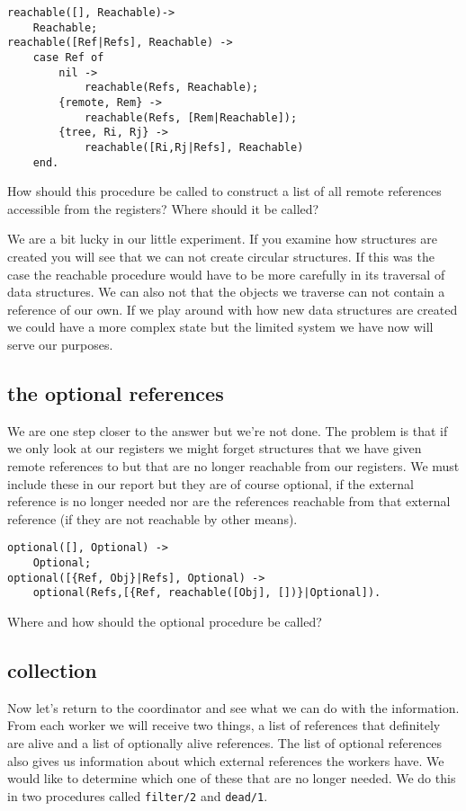 \documentclass[a4paper,11pt]{article}
\begin{document}
\begin{verbatim}
reachable([], Reachable)->
    Reachable;
reachable([Ref|Refs], Reachable) ->
    case Ref of
        nil ->
            reachable(Refs, Reachable);
        {remote, Rem} ->
            reachable(Refs, [Rem|Reachable]);
        {tree, Ri, Rj} ->
            reachable([Ri,Rj|Refs], Reachable)
    end.
\end{verbatim}

How should this procedure be called to construct a list of all remote
references accessible from the registers? Where should it be called?

We are a bit lucky in our little experiment. If you examine how
structures are created you will see that we can not create circular
structures. If this was the case the reachable procedure would have to
be more carefully in its traversal of data structures. We can also not
that the objects we traverse can not contain a reference of our
own. If we play around with how new data structures are created we
could have a more complex state but the limited system we have now
will serve our purposes.

\subsection{the optional references}

We are one step closer to the answer but we're not done. The
problem is that if we only look at our registers we might forget
structures that we have given remote references to but that are no longer
reachable from our registers. We must include these in our report but
they are of course optional, if the external reference is no longer
needed nor are the references reachable from that external reference
(if they are not reachable by other means). 

\begin{verbatim}
optional([], Optional) ->
    Optional;
optional([{Ref, Obj}|Refs], Optional) ->
    optional(Refs,[{Ref, reachable([Obj], [])}|Optional]).
\end{verbatim}

Where and how should the optional procedure be called?

\subsection{collection}

Now let's return to the coordinator and see what we can do with the
information. From each worker we will receive two things, a list of
references that definitely are alive and a list of optionally alive
references. The list of optional references also gives us information
about which external references the workers have. We would like to
determine which one of these that are no longer needed. We do this in
two procedures called {\tt filter/2} and {\tt dead/1}.
\end{document}
